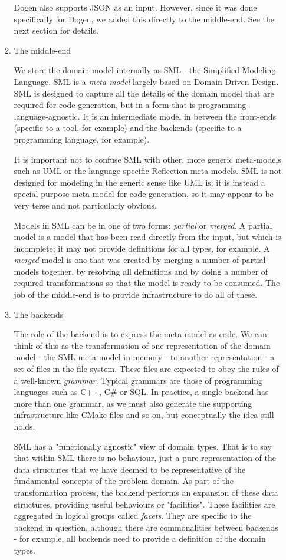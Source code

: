 \documentclass[11pt]{article}
\begin{document}
\begin{enumerate}
\begin{enumerate}
Dogen also supports JSON as an input. However, since it was done
specifically for Dogen, we added this directly to the middle-end. See
the next section for details.

\item The middle-end
\label{sec-2-2-1-2-2}

We store the domain model internally as SML - the Simplified Modeling
Language. SML is a \emph{meta-model} largely based on Domain Driven
Design. SML is designed to capture all the details of the domain model
that are required for code generation, but in a form that is
programming-language-agnostic. It is an intermediate model in between
the front-ends (specific to a tool, for example) and the backends
(specific to a programming language, for example).

It is important not to confuse SML with other, more generic
meta-models such as UML or the language-specific Reflection
meta-models. SML is not designed for modeling in the generic sense
like UML is; it is instead a special purpose meta-model for code
generation, so it may appear to be very terse and not particularly
obvious.

Models in SML can be in one of two forms: \emph{partial} or \emph{merged}. A
partial model is a model that has been read directly from the input,
but which is incomplete; it may not provide definitions for all types,
for example. A \emph{merged} model is one that was created by merging a
number of partial models together, by resolving all definitions and by
doing a number of required transformations so that the model is ready
to be consumed. The job of the middle-end is to provide infrastructure
to do all of these.

\item The backends
\label{sec-2-2-1-2-3}

The role of the backend is to express the meta-model as code. We can
think of this as the transformation of one representation of the
domain model - the SML meta-model in memory - to another
representation - a set of files in the file system. These files are
expected to obey the rules of a well-known \emph{grammar}. Typical grammars
are those of programming languages such as C++, C\# or SQL. In
practice, a single backend has more than one grammar, as we must also
generate the supporting infrastructure like CMake files and so on, but
conceptually the idea still holds.

SML has a "functionally agnostic" view of domain types. That is to say
that within SML there is no behaviour, just a pure representation of
the data structures that we have deemed to be representative of the
fundamental concepts of the problem domain. As part of the
transformation process, the backend performs an expansion of these
data structures, providing useful behaviours or "facilities". These
facilities are aggregated in logical groups called \emph{facets}. They are
specific to the backend in question, although there are commonalities
between backends - for example, all backends need to provide a
definition of the domain types.


\end{enumerate}
\end{enumerate}
\end{document}
